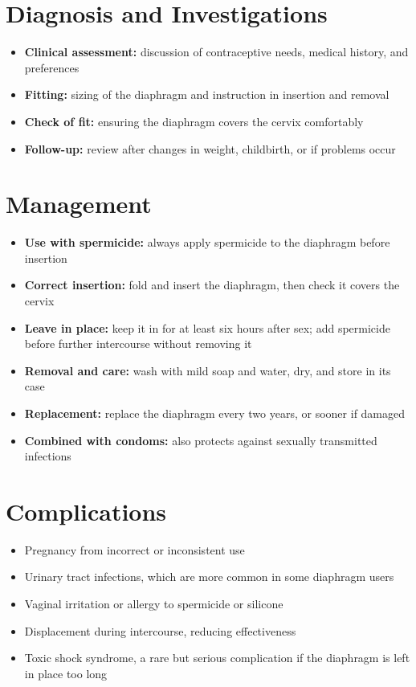 \section*{Diagnosis and Investigations}
\begin{itemize}
    \item \textbf{Clinical assessment:} discussion of contraceptive needs, medical history, and preferences
    \item \textbf{Fitting:} sizing of the diaphragm and instruction in insertion and removal
    \item \textbf{Check of fit:} ensuring the diaphragm covers the cervix comfortably
    \item \textbf{Follow-up:} review after changes in weight, childbirth, or if problems occur
\end{itemize}

\section*{Management}
\begin{itemize}
    \item \textbf{Use with spermicide:} always apply spermicide to the diaphragm before insertion
    \item \textbf{Correct insertion:} fold and insert the diaphragm, then check it covers the cervix
    \item \textbf{Leave in place:} keep it in for at least six hours after sex; add spermicide before further intercourse without removing it
    \item \textbf{Removal and care:} wash with mild soap and water, dry, and store in its case
    \item \textbf{Replacement:} replace the diaphragm every two years, or sooner if damaged
    \item \textbf{Combined with condoms:} also protects against sexually transmitted infections
\end{itemize}

\section*{Complications}
\begin{itemize}
    \item Pregnancy from incorrect or inconsistent use
    \item Urinary tract infections, which are more common in some diaphragm users
    \item Vaginal irritation or allergy to spermicide or silicone
    \item Displacement during intercourse, reducing effectiveness
    \item Toxic shock syndrome, a rare but serious complication if the diaphragm is left in place too long
\end{itemize}

